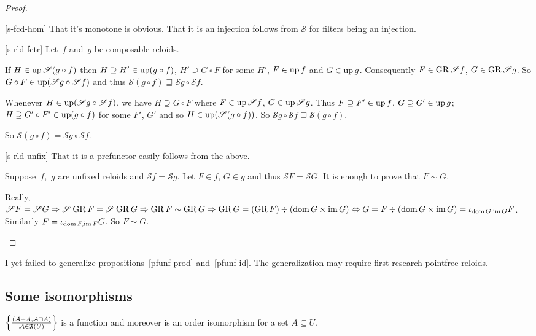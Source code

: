 \begin{proof}
~
\begin{widedisorder}
\item[\ref{s-fcd-hom}] That it's monotone is obvious.
That it is an injection follows from $\mathscr{S}$ for filters
being an injection.

\item[\ref{s-rld-fctr}]
Let~$f$ and~$g$ be composable reloids.

If $H\in\operatorname{up}\mathscr{S}(g\circ f)$ then
$H\supseteq H'\in\operatorname{up}(g\circ f)$,
$H'\supseteq G\circ F$ for some $H'$,
$F\in\operatorname{up} f$ and $G\in\operatorname{up} g$. Consequently
$F\in\operatorname{GR}\mathscr{S}f$, $G\in\operatorname{GR}\mathscr{S}g$. So
$G\circ F\in\operatorname{up}(\mathscr{S}g\circ\mathscr{S}f)$
and thus
$\mathscr{S}(g\circ f)\sqsupseteq
\mathscr{S}g\circ\mathscr{S}f$.

Whenever $H\in\operatorname{up}(\mathscr{S}g\circ\mathscr{S}f)$,
we have
$H\supseteq G\circ F$ where $F\in\operatorname{up}\mathscr{S}f$,
$G\in\operatorname{up}\mathscr{S}g$. Thus
$F\supseteq F'\in\operatorname{up} f$, $G\supseteq G'\in\operatorname{up} g$;
$H\supseteq G'\circ F'\in\operatorname{up}(g\circ f)$
for some $F'$, $G'$ and so
$H\in\operatorname{up}(\mathscr{S}(g\circ f))$. So
$\mathscr{S}g\circ\mathscr{S}f\sqsupseteq
\mathscr{S}(g\circ f)$.

So
$\mathscr{S}(g\circ f)=\mathscr{S}g\circ\mathscr{S}f$.

\item[\ref{s-rld-unfix}]
That it is a prefunctor easily follows from the above.

Suppose~$f$,~$g$ are unfixed reloids and
$\mathscr{S}f=\mathscr{S}g$.
Let $F\in f$, $G\in g$ and thus
$\mathscr{S}F=\mathscr{S}G$.
It is enough to prove that $F\sim G$.

Really, $\mathscr{S}F=\mathscr{S}G\Rightarrow
\mathscr{S}\operatorname{GR} F=\mathscr{S}\operatorname{GR} G\Rightarrow
\operatorname{GR} F\sim\operatorname{GR} G\Rightarrow
\operatorname{GR} G=(\operatorname{GR} F)\div(\operatorname{dom} G\times\operatorname{im} G)\Leftrightarrow
G=F\div(\operatorname{dom} G\times\operatorname{im} G)=
\iota_{\operatorname{dom} G,\operatorname{im} G}F$.
Similarly $F=\iota_{\operatorname{dom} F,\operatorname{im} F}G$.
So $F\sim G$.
\end{widedisorder}
\end{proof}

I yet failed to generalize propositions~\ref{pfunf-prod}
and~\ref{pfunf-id}. The generalization may require first
research pointfree reloids.

\subsection{Some isomorphisms}

\begin{prop}
  $\left\{ \frac{ (\mathcal{A} \div A , \mathcal{A} \sqcap A) }{
  \mathcal{A} \in \mathfrak{F} (U) }\right\}$ is a function and
  moreover is an order isomorphism for a set $A \subseteq U$.
\end{prop}


